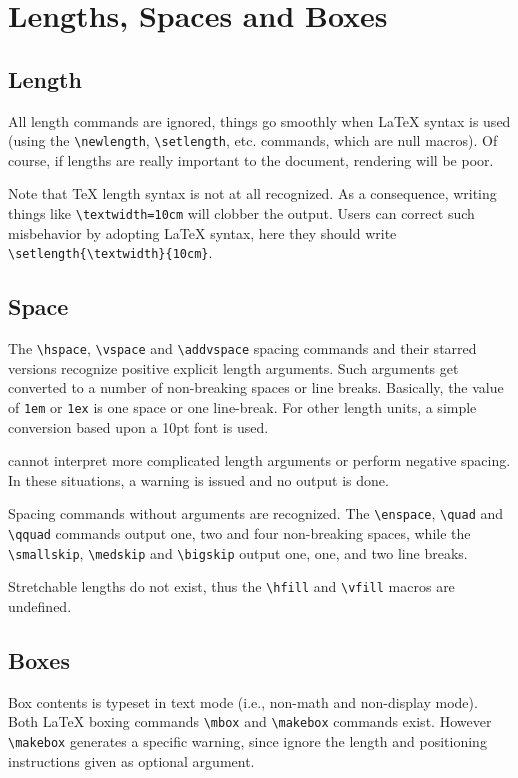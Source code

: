 \section{Lengths, Spaces and Boxes}

\subsection{Length}

All length commands are ignored, things go smoothly when \LaTeX{} syntax is
used (using the \verb+\newlength+, \verb+\setlength+, etc. commands,
which are null macros).
Of course, if lengths are really important to the document, rendering
will be poor.

Note that \TeX{} length syntax is not at all recognized. As a
consequence, writing things like \verb+\textwidth=10cm+ will clobber
the output.
Users can correct such misbehavior by adopting \LaTeX{} syntax, here
they should write
\verb+\setlength{\textwidth}{10cm}+.


\subsection{Space}
The \verb+\hspace+, \verb+\vspace+ and \verb+\addvspace+ spacing
commands and their starred versions recognize positive explicit length
arguments.  Such arguments get converted to a number of non-breaking
spaces or line breaks.
Basically, the value of \verb+1em+ or \verb+1ex+ is one space or one
line-break. For other length units, a simple conversion based upon a
10pt font is used.


\hevea{} cannot interpret more complicated length arguments
or perform negative spacing.
In these situations, a warning is issued and no output is done.

Spacing commands without arguments are recognized.
The \verb+\enspace+, \verb+\quad+ and \verb+\qquad+ commands output
one, two and four non-breaking spaces, while the \verb+\smallskip+,
\verb+\medskip+ and \verb+\bigskip+ output one, one, and two line
breaks.

Stretchable lengths do not exist, thus the \verb+\hfill+ and
\verb+\vfill+ macros are undefined.

\subsection{Boxes}

Box contents is typeset in text mode (i.e., non-math and non-display
mode).
Both \LaTeX{} boxing commands \verb+\mbox+ and \verb+\makebox+
commands exist.
However  \verb+\makebox+ generates a specific warning, since \hevea{}
ignore the length and positioning instructions given as optional
argument.

